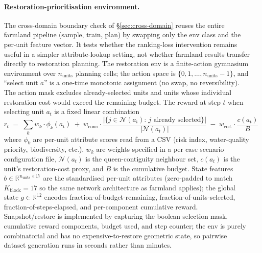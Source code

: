 \documentclass[11pt]{article}
\begin{document}
\paragraph{Restoration-prioritisation environment.}\label{sec:methods-restoration}

The cross-domain boundary check of \S\ref{sec:cross-domain} reuses the entire farmland pipeline (sample, train, plan) by swapping only the env class and the per-unit feature vector. It tests whether the ranking-loss intervention remains useful in a simpler attribute-lookup setting, not whether farmland results transfer directly to restoration planning. The restoration env is a finite-action gymnasium environment over $n_{\text{units}}$ planning cells; the action space is $\{0, 1, \ldots, n_{\text{units}}-1\}$, and ``select unit $a$'' is a one-time monotonic assignment (no swap, no reversibility). The action mask excludes already-selected units and units whose individual restoration cost would exceed the remaining budget. The reward at step $t$ when selecting unit $a_t$ is a fixed linear combination
\begin{equation*}
r_t \;=\; \sum_{k} w_k \cdot \phi_k(a_t)\;+\;w_{\text{conn}} \cdot \frac{|\{j \in \mathcal{N}(a_t):\,j\text{ already selected}\}|}{|\mathcal{N}(a_t)|}\;-\;w_{\text{cost}} \cdot \frac{c(a_t)}{B}
\end{equation*}
where $\phi_k$ are per-unit attribute scores read from a CSV (risk index, water-quality priority, biodiversity, etc.), $w_k$ are weights specified in a per-case scenario configuration file, $\mathcal{N}(a_t)$ is the queen-contiguity neighbour set, $c(a_t)$ is the unit's restoration-cost proxy, and $B$ is the cumulative budget. State features $b \in \mathbb{R}^{n_{\text{units}} \times 17}$ are the standardised per-unit attributes (zero-padded to match $K_{\text{block}}=17$ so the same network architecture as farmland applies); the global state $g \in \mathbb{R}^{12}$ encodes fraction-of-budget-remaining, fraction-of-units-selected, fraction-of-steps-elapsed, and per-component cumulative reward. Snapshot/restore is implemented by capturing the boolean selection mask, cumulative reward components, budget used, and step counter; the env is purely combinatorial and has no expensive-to-restore geometric state, so pairwise dataset generation runs in seconds rather than minutes.
\end{document}
